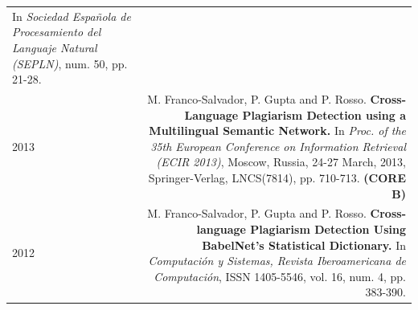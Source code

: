 \documentclass[10pt]{article}
\begin{document}
\begin{tabular}{L!{\VRule}R}
    In \emph{Sociedad Espa{\~n}ola de Procesamiento del Languaje Natural (SEPLN)}, num. 50, pp. 21-28. \vspace{5pt}\\
2013&M. Franco-Salvador, P. Gupta and P. Rosso. \textbf{Cross-Language Plagiarism Detection using a Multilingual Semantic Network.}
    In \emph{Proc. of the 35th European Conference on Information Retrieval (ECIR 2013)}, Moscow, Russia, 24-27 March, 2013, Springer-Verlag, LNCS(7814), pp. 710-713. \textbf{(CORE B)}\vspace{5pt}\\
2012&M. Franco-Salvador, P. Gupta and P. Rosso. \textbf{Cross-language Plagiarism Detection Using BabelNet's Statistical Dictionary.}
    In \emph{Computaci{\'o}n y Sistemas, Revista Iberoamericana de Computaci{\'o}n}, ISSN 1405-5546, vol. 16, num. 4, pp. 383-390.\vspace{5pt}\\
\end{tabular}
\end{document}
